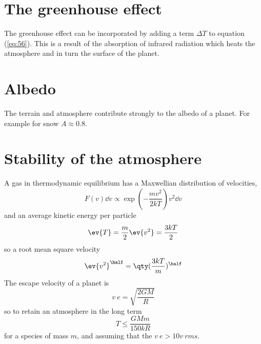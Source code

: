 \section{The greenhouse effect}
\label{sec:greenhouse-effect}

The greenhouse effect can be incorporated by adding a term $\Delta T$
to equation (\ref{eq:56}). This is a result of the absorption of
infrared radiation which heats the atmosphere and in turn the surface
of the planet.

\section{Albedo}
\label{sec:albedo-1}

The terrain and atmosphere contribute strongly to the albedo of a
planet. For example for snow $A \approx 0.8$.

\section{Stability of the atmosphere}
\label{sec:stability-atmosphere}

A gas in thermodynamic equilibrium has a Maxwellian distribution of
velocities,
\[ F(v) \dd{v} \propto \exp( - \frac{m v^2}{2 kT} ) v^2 \dd{v} \]
and an average kinetic energy per particle
\[ \ev{T} = \frac{m}{2} \ev{v^2} = \frac{3 kT}{2} \]
so a root mean square velocity
\[ \ev{v^2}^{\half} = \qty(\frac{3kT}{m})^{\half} \] The escape
velocity of a planet is
\[ v~e = \sqrt{\frac{2GM}{R}} \]
so to retain an atmosphere in the long term 
\begin{equation}
  \label{eq:57}
  T \le \frac{GMm}{150 k R} 
\end{equation}
for a species of mass $m$, and assuming that the $v~e > 10 v~{rms}$.

